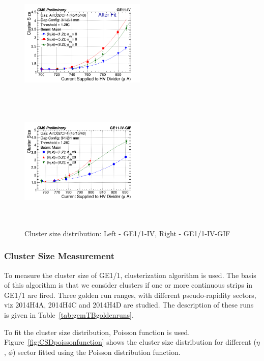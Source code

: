 \begin{figure}[!htbp]
   \begin{center}
     \includegraphics[width=6cm,height=6cm]{figures/GEM/CurrentvsClusterSizeAll3EtaPhi.png}%
     \includegraphics[width=6cm,height=6cm]{figures/GEM/CurrentvsClusterSizeAll3EtaPhiGE11IVGIF.png}
   \end{center}
   \caption{Cluster size distribution: Left - GE1/1-IV, Right - GE1/1-IV-GIF}
   \label{fig:CSDGE1/1}
\end{figure}


\subsubsection{Cluster Size Measurement}
To measure the cluster size of GE1/1, clusterization algorithm is used.
The basis of this algorithm is that we consider clusters if one or more continuous strips in GE1/1 are fired.
Three golden run ranges, with different pseudo-rapidity sectors, viz 2014H4A, 2014H4C and 2014H4D are studied.
The description of these runs is given in Table~\ref{tab:gemTBgoldenruns}.

To fit the cluster size distribution, Poisson function is used. Figure~\ref{fig:CSDpoissonfunction} shows the cluster size distribution for different ($\eta$, $\phi$) sector fitted using the Poisson distribution function.

